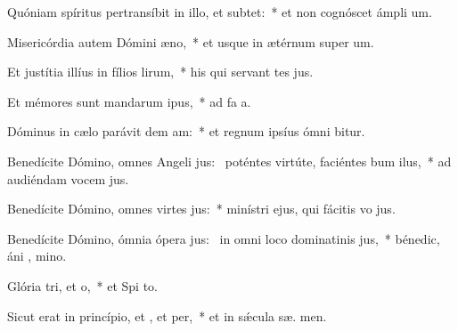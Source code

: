 \item Quóniam spíritus pertransíbit in illo, et  subtet:~* et non cognóscet ámpli  um.
\item Misericórdia autem Dómini  æno,~* et usque in ætérnum super  um.
\item Et justítia illíus in fílios lirum,~* his qui servant tes jus.
\item Et mémores sunt mandarum ipus,~* ad fa a.
\item Dóminus in cælo parávit dem am:~* et regnum ipsíus ómni bitur.
\item Benedícite Dómino, omnes Angeli jus:~\pscross{} poténtes virtúte, faciéntes bum ilus,~* ad audiéndam vocem  jus.
\item Benedícite Dómino, omnes virtes jus:~* minístri ejus, qui fácitis vo jus.
\item Benedícite Dómino, ómnia ópera jus:~\pscross{} in omni loco dominatinis jus,~* bénedic, áni , mino.
\item Glória tri, et o,~* et Spi to.
\item Sicut erat in princípio, et , et per,~* et in sǽcula sæ. men.

